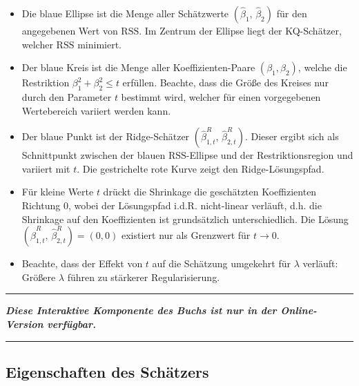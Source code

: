 \documentclass[
  a4paper,
  DIV=11,
  oneside]{scrreprt}
\begin{document}
\begin{itemize}
\item
  Die blaue Ellipse ist die Menge aller Schätzwerte
  \(\left(\widehat\beta_{1},\, \widehat\beta_{2}\right)\) für den
  angegebenen Wert von \(\mathrm{RSS}\). Im Zentrum der Ellipse liegt
  der KQ-Schätzer, welcher \(\mathrm{RSS}\) minimiert.
\item
  Der blaue Kreis ist die Menge aller Koeffizienten-Paare
  \((\beta_1, \beta_2)\), welche die Restriktion
  \(\beta_1^2 + \beta_2^2\leq t\) erfüllen. Beachte, dass die Größe des
  Kreises nur durch den Parameter \(t\) bestimmt wird, welcher für einen
  vorgegebenen Wertebereich variiert werden kann.
\item
  Der blaue Punkt ist der Ridge-Schätzer
  \((\widehat\beta^R_{1,t},\, \widehat\beta^R_{2,t})\). Dieser ergibt
  sich als Schnittpunkt zwischen der blauen \(\mathrm{RSS}\)-Ellipse und
  der Restriktionsregion und variiert mit \(t\). Die gestrichelte rote
  Kurve zeigt den Ridge-Lösungspfad.
\item
  Für kleine Werte \(t\) drückt die Shrinkage die geschätzten
  Koeffizienten Richtung 0, wobei der Lösungspfad i.d.R. nicht-linear
  verläuft, d.h. die Shrinkage auf den Koeffizienten ist grundsätzlich
  unterschiedlich. Die Lösung
  \((\widehat\beta^R_{1,t},\, \widehat\beta^R_{2,t}) = (0,0)\) existiert
  nur als Grenzwert für \(t\to0\).
\item
  Beachte, dass der Effekt von \(t\) auf die Schätzung umgekehrt für
  \(\lambda\) verläuft: Größere \(\lambda\) führen zu stärkerer
  Regularisierung.
\end{itemize}

\begin{center}\rule{0.5\linewidth}{0.5pt}\end{center}

\textbf{\emph{Diese Interaktive Komponente des Buchs ist nur in der
Online-Version verfügbar.}}

\begin{center}\rule{0.5\linewidth}{0.5pt}\end{center}

\subsection{Eigenschaften des
Schätzers}\label{eigenschaften-des-schuxe4tzers}
\end{document}
